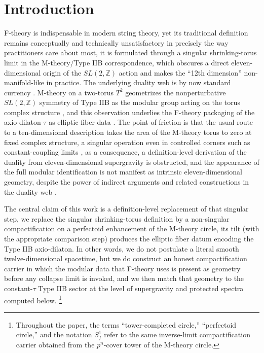 \documentclass[11pt]{article}
\theoremstyle{remark}
\newcommand{\Z}{\mathbb{Z}}
\begin{document}
\newpage
\tableofcontents
\newpage
\section{Introduction}\label{sec:intro}

F-theory is indispensable in modern string theory, yet its traditional definition remains conceptually and technically unsatisfactory in precisely the way practitioners care about most, it is formulated through a singular shrinking-torus limit in the M-theory/Type IIB correspondence, which obscures a direct eleven-dimensional origin of the \(SL(2,\Z)\) action and makes the ``12th dimension'' non-manifold-like in practice. The underlying duality web is by now standard currency \cite{Polchinski1998, Witten1995, Townsend1996, HullTownsend1995}. M-theory on a two-torus \(T^{2}\) geometrizes the nonperturbative \(SL(2,\Z)\) symmetry of Type IIB as the modular group acting on the torus complex structure \cite{Vafa1996, Sen1996, Schwarz1995}, and this observation underlies the F-theory packaging of the axio-dilaton \(\tau\) as elliptic-fiber data \cite{Vafa1996, MorrisonVafa1996a, MorrisonVafa1996b}. The point of friction is that the usual route to a ten-dimensional description takes the area of the M-theory torus to zero at fixed complex structure, a singular operation even in controlled corners such as constant-coupling limits \cite{DasguptaMukhi1996, GopakumarVafa1998}, as a consequence, a definition-level derivation of the duality from eleven-dimensional supergravity is obstructed, and the appearance of the full modular identification is not manifest as intrinsic eleven-dimensional geometry, despite the power of indirect arguments and related constructions in the duality web \cite{Sen1996b, KatzVafa1997, Aspinwall1996}.

The central claim of this work is a definition-level replacement of that singular step, we replace the singular shrinking-torus definition by a non-singular compactification on a perfectoid enhancement of the M-theory circle, its tilt (with the appropriate comparison step) produces the elliptic fiber datum encoding the Type IIB axio-dilaton. In other words, we do not postulate a literal smooth twelve-dimensional spacetime, but we do construct an honest compactification carrier in which the modular data that F-theory uses is present as geometry before any collapse limit is invoked, and we then match that geometry to the constant-\(\tau\) Type IIB sector at the level of supergravity and protected spectra computed below. \footnote{Throughout the paper, the terms ``tower-completed circle,'' ``perfectoid circle,'' and the notation $S_f^1$ refer to the same inverse-limit compactification carrier obtained from the $p^n$-cover tower of the M-theory circle.
}
\end{document}
